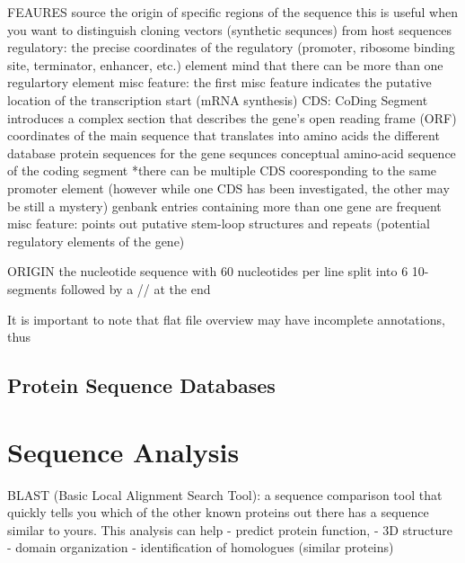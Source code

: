 \documentclass[10pt]{article}
\begin{document}
      FEAURES
        source        the origin of specific regions of the sequence
          this is useful when you want to distinguish cloning vectors (synthetic sequnces) from host sequences
        regulatory:   the precise coordinates of the regulatory (promoter, ribosome binding site, terminator, enhancer, etc.) element 
          mind that there can be more than one regulartory element
        misc feature: the first misc feature indicates the putative location of the transcription start (mRNA synthesis)
        CDS:          CoDing Segment introduces a complex section that describes the gene's open reading frame (ORF)
          coordinates of the main sequence that translates into amino acids
          the different database protein sequences for the gene sequnces
          conceptual amino-acid sequence of the coding segment
          *there can be multiple CDS cooresponding to the same promoter element (however while one CDS has been investigated, the other may be still a mystery)
            genbank entries containing more than one gene are frequent
        misc feature: points out putative stem-loop structures and repeats (potential regulatory elements of the gene)

      ORIGIN
        the nucleotide sequence with 60 nucleotides per line split into 6 10-segments followed by a // at the end
  
    It is important to note that flat file overview may have incomplete annotations, thus 

  \subsection{Protein Sequence Databases}

\section{Sequence Analysis}

BLAST (Basic Local Alignment Search Tool): a sequence comparison tool that quickly tells you which of the other known proteins out there has a sequence similar to yours. This analysis can help
- predict protein function,
- 3D structure
- domain organization
- identification of homologues (similar proteins)
\end{document}

